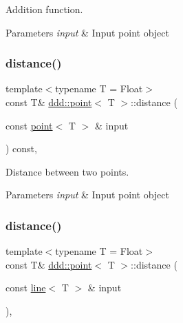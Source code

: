 Addition function. 


\begin{DoxyParams}{Parameters}
{\em input} & Input point object \\
\hline
\end{DoxyParams}
\mbox{\label{classddd_1_1point_a36798ea778572d6145a709e7baf7893f}} 
\subsubsection{\texorpdfstring{distance()}{distance()}\hspace{0.1cm}{\footnotesize\ttfamily [1/3]}}
{\footnotesize\ttfamily template$<$typename T = Float$>$ \\
const T\& \hyperlink{classddd_1_1point}{ddd\+::point}$<$ T $>$\+::distance (\begin{DoxyParamCaption}\item[{const \hyperlink{classddd_1_1point}{point}$<$ T $>$ \&}]{input }\end{DoxyParamCaption}) const\hspace{0.3cm}{\ttfamily [inline]}, {\ttfamily [inherited]}}



Distance between two points. 


\begin{DoxyParams}{Parameters}
{\em input} & Input point object \\
\hline
\end{DoxyParams}
\mbox{\label{classddd_1_1point_a8f6afdb0816e235ffd63a9d31a91e65f}} 
\subsubsection{\texorpdfstring{distance()}{distance()}\hspace{0.1cm}{\footnotesize\ttfamily [2/3]}}
{\footnotesize\ttfamily template$<$typename T = Float$>$ \\
const T\& \hyperlink{classddd_1_1point}{ddd\+::point}$<$ T $>$\+::distance (\begin{DoxyParamCaption}\item[{const \hyperlink{classddd_1_1line}{line}$<$ T $>$ \&}]{input }\end{DoxyParamCaption})\hspace{0.3cm}{\ttfamily [inline]}, {\ttfamily [inherited]}}



